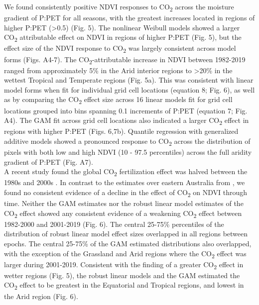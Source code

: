 \documentclass[gc, manuscript]{copernicus}
\begin{document}
We found consistently positive NDVI responses to CO\textsubscript{2}
across the moisture gradient of P:PET for all seasons, with the greatest
increases located in regions of higher P:PET (\textgreater0.5) (Fig. 5).
The nonlinear Weibull models showed a larger CO\textsubscript{2}
attributable effect on NDVI in regions of higher P:PET (Fig. 5), but the
effect size of the NDVI response to CO\textsubscript{2} was largely
consistent across model forms (Figs. A4-7). The
CO\textsubscript{2}-attributable increase in NDVI between 1982-2019
ranged from approximately 5\% in the Arid interior regions to
\textgreater20\% in the wettest Tropical and Temperate regions (Fig.
5a). This was consistent with linear model forms when fit for individual
grid cell locations (equation 8; Fig. 6), as well as by comparing the
CO\textsubscript{2} effect size across 16 linear models fit for grid
cell locations grouped into bins spanning 0.1 increments of P:PET
(equation 7; Fig. A4). The GAM fit across grid cell locations also
indicated a larger CO\textsubscript{2} effect in regions with higher
P:PET (Figs. 6,7b). Quantile regression with generalized additive models
showed a pronounced response to CO\textsubscript{2} across the
distribution of pixels with both low and high NDVI (10 - 97.5
percentiles) across the full aridity gradient of P:PET (Fig. A7).\\
A recent study found the global CO\textsubscript{2} fertilization effect
was halved between the 1980s and 2000s
\citep{wangRecentGlobalDecline2020}. In contrast to the estimates over
eastern Australia from \citet{wangRecentGlobalDecline2020}, we found no
consistent evidence of a decline in the effect of CO\textsubscript{2} on
NDVI through time. Neither the GAM estimates nor the robust linear model
estimates of the CO\textsubscript{2} effect showed any consistent
evidence of a weakening CO\textsubscript{2} effect between 1982-2000 and
2001-2019 (Fig. 6). The central 25-75\% percentiles of the distribution
of robust linear model effect sizes overlapped in all regions between
epochs. The central 25-75\% of the GAM estimated distributions also
overlapped, with the exception of the Grassland and Arid regions where
the CO\textsubscript{2} effect was larger during 2001-2019. Consistent
with the finding of a greater CO\textsubscript{2} effect in wetter
regions (Fig. 5), the robust linear models and the GAM estimated the
CO\textsubscript{2} effect to be greatest in the Equatorial and Tropical
regions, and lowest in the Arid region (Fig. 6).\\
\clearpage
\end{document}
